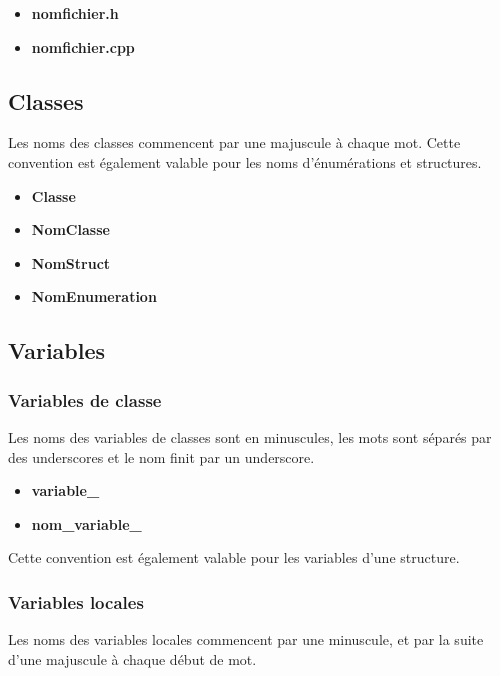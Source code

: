 \documentclass[]{article}
\begin{document}
\begin{itemize}
	\item \textbf{nomfichier.h}
	\item \textbf{nomfichier.cpp}
\end{itemize}

\subsection{Classes}

Les noms des classes commencent par une majuscule à chaque mot.
Cette convention est également valable pour les noms 
d'énumérations et structures.

\begin{itemize}
	\item \textbf{Classe}
	\item \textbf{NomClasse}
	\item \textbf{NomStruct}
	\item \textbf{NomEnumeration}
\end{itemize}

\newpage

\subsection{Variables}

\subsubsection{Variables de classe}

Les noms des variables de classes sont en minuscules, les mots sont 
séparés par des underscores et le nom finit par un underscore.

\begin{itemize}
	\item \textbf{variable\_}
	\item \textbf{nom\_variable\_}
\end{itemize}

Cette convention est également valable pour les variables d'une
structure.

\subsubsection{Variables locales}

Les noms des variables locales commencent par une minuscule, et par
la suite d'une majuscule à chaque début de mot.
\end{document}
